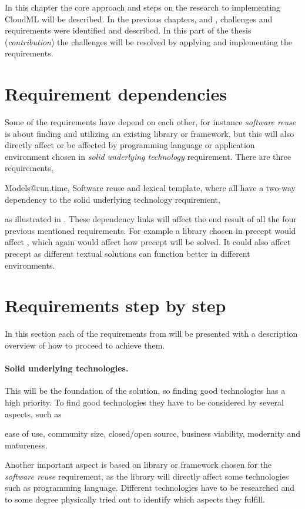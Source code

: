 %

In this chapter the core approach and steps on the research to implementing CloudML will be described.
In the previous chapters,  and , 
challenges and requirements were identified and described.
In this part of the thesis (\emph{contribution}) the challenges will be resolved
by applying and implementing the requirements.

\section{Requirement dependencies}


Some of the requirements have depend on each other, for instance \emph{software reuse} is about finding
and utilizing an existing library or framework, but this will also directly affect or be affected by
programming language or application environment chosen in \emph{solid underlying technology} requirement.
There are three requirements, 
\begin{ii}
  \iitem Models@run.time,
  \iitem Software reuse and
  \iitem lexical template,
    where all have a two-way dependency to the 
  \iitem solid underlying technology requirement,
\end{ii}
as illustrated in .
These dependency links will affect the end result of all the four previous mentioned requirements.
For example a library chosen in precept  would affect , which again would affect
how precept  will be solved. 
It could also affect precept  as different textual solutions can function better in
different environments.

\section{Requirements step by step}

In this section each of the requirements from  will be presented 
with a description overview of how to proceed to achieve them.

\paragraph{Solid underlying technologies.}
This will be the foundation of the solution, so finding good technologies has a high priority.
To find good technologies they have to be considered by several aspects, such as
\begin{ii}
  \iitem ease of use,
  \iitem community size,
  \iitem closed/open source,
  \iitem business viability,
  \iitem modernity and 
  \iitem matureness.
\end{ii}
Another important aspect is based on library or framework chosen for the \emph{software reuse} requirement,
as the library will directly affect some technologies such as programming language.
Different technologies have to be researched and to some degree physically tried out to identify
which aspects they fulfill.

